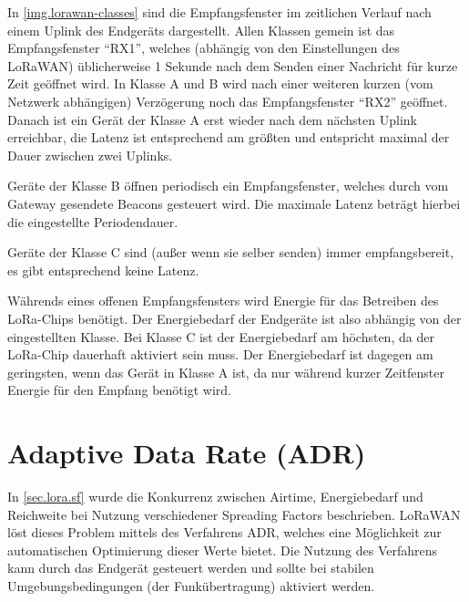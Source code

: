 In \autoref{img.lorawan-classes} sind die Empfangsfenster im zeitlichen Verlauf nach einem Uplink des Endgeräts dargestellt.
Allen Klassen gemein ist das Empfangsfenster "`RX1"', welches (abhängig von den Einstellungen des LoRaWAN) üblicherweise 1 Sekunde nach dem Senden einer Nachricht für kurze Zeit geöffnet wird.
In Klasse A und B wird nach einer weiteren kurzen (vom Netzwerk abhängigen) Verzögerung noch das Empfangsfenster "`RX2"' geöffnet.
Danach ist ein Gerät der Klasse A erst wieder nach dem nächsten Uplink erreichbar, die Latenz ist entsprechend am größten und entspricht maximal der Dauer zwischen zwei Uplinks.

Geräte der Klasse B öffnen periodisch ein Empfangsfenster, welches durch vom Gateway gesendete Beacons gesteuert wird.
Die maximale Latenz beträgt hierbei die eingestellte Periodendauer.

Geräte der Klasse C sind (außer wenn sie selber senden) immer empfangsbereit, es gibt entsprechend keine Latenz.

Währends eines offenen Empfangsfensters wird Energie für das Betreiben des LoRa-Chips benötigt.
Der Energiebedarf der Endgeräte ist also abhängig von der eingestellten Klasse.
Bei Klasse C ist der Energiebedarf am höchsten, da der LoRa-Chip dauerhaft aktiviert sein muss.
Der Energiebedarf ist dagegen am geringsten, wenn das Gerät in Klasse A ist, da nur während kurzer Zeitfenster Energie für den Empfang benötigt wird.



\section{Adaptive Data Rate (ADR)}\label{sec.lorawan.adr}
In \autoref{sec.lora.sf} wurde die Konkurrenz zwischen Airtime, Energiebedarf und Reichweite bei Nutzung verschiedener Spreading Factors beschrieben.
LoRaWAN löst dieses Problem mittels des Verfahrens \gls{ADR}, welches eine Möglichkeit zur automatischen Optimierung dieser Werte bietet.
Die Nutzung des Verfahrens kann durch das Endgerät gesteuert werden und sollte bei stabilen Umgebungsbedingungen (der Funkübertragung) aktiviert werden.
\cite{loraadr}

